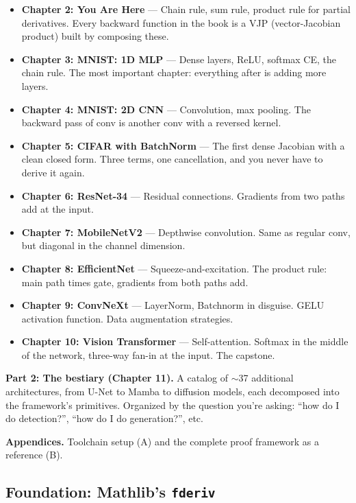 \begin{itemize}
  \item \textbf{Chapter 2: You Are Here} --- Chain rule, sum rule, product
    rule for partial derivatives. Every backward function in the book is
    a VJP (vector-Jacobian product) built by composing these.
  \item \textbf{Chapter 3: MNIST: 1D MLP} --- Dense layers, ReLU, softmax CE,
    the chain rule. The most important chapter: everything after is
    adding more layers.
  \item \textbf{Chapter 4: MNIST: 2D CNN} --- Convolution, max pooling. The
    backward pass of conv is another conv with a reversed kernel.
  \item \textbf{Chapter 5: CIFAR with BatchNorm} --- The first dense Jacobian
    with a clean closed form. Three terms, one cancellation, and you
    never have to derive it again.
  \item \textbf{Chapter 6: ResNet-34} --- Residual connections. Gradients from
    two paths add at the input.
  \item \textbf{Chapter 7: MobileNetV2} --- Depthwise convolution. Same as
    regular conv, but diagonal in the channel dimension.
  \item \textbf{Chapter 8: EfficientNet} --- Squeeze-and-excitation. The
    product rule: main path times gate, gradients from both paths add.
  \item \textbf{Chapter 9: ConvNeXt} --- LayerNorm, Batchnorm in
    disguise. GELU activation function. Data augmentation strategies.
  \item \textbf{Chapter 10: Vision Transformer} --- Self-attention. Softmax
    in the middle of the network, three-way fan-in at the input. The
    capstone.
\end{itemize}

\textbf{Part 2: The bestiary (Chapter 11).} A catalog of $\sim$37
additional architectures, from U-Net to Mamba to diffusion models,
each decomposed into the framework's primitives. Organized by the
question you're asking: ``how do I do detection?'', ``how do I do
generation?'', etc.

\textbf{Appendices.} Toolchain setup (A) and the complete proof framework
as a reference (B).

\subsection*{Foundation: Mathlib's \texttt{fderiv}}

